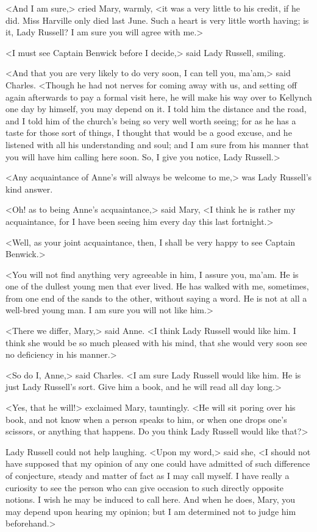 <And I am sure,> cried Mary, warmly, <it was a very little to his credit, if he did. Miss Harville only died last June. Such a heart is very little worth having; is it, Lady Russell? I am sure you will agree with me.>

<I must see Captain Benwick before I decide,> said Lady Russell, smiling.

<And that you are very likely to do very soon, I can tell you, ma'am,> said Charles. <Though he had not nerves for coming away with us, and setting off again afterwards to pay a formal visit here, he will make his way over to Kellynch one day by himself, you may depend on it. I told him the distance and the road, and I told him of the church's being so very well worth seeing; for as he has a taste for those sort of things, I thought that would be a good excuse, and he listened with all his understanding and soul; and I am sure from his manner that you will have him calling here soon. So, I give you notice, Lady Russell.>

<Any acquaintance of Anne's will always be welcome to me,> was Lady Russell's kind answer.

<Oh! as to being Anne's acquaintance,> said Mary, <I think he is rather my acquaintance, for I have been seeing him every day this last fortnight.>

<Well, as your joint acquaintance, then, I shall be very happy to see Captain Benwick.>

<You will not find anything very agreeable in him, I assure you, ma'am. He is one of the dullest young men that ever lived. He has walked with me, sometimes, from one end of the sands to the other, without saying a word. He is not at all a well-bred young man. I am sure you will not like him.>

<There we differ, Mary,> said Anne. <I think Lady Russell would like him. I think she would be so much pleased with his mind, that she would very soon see no deficiency in his manner.>

<So do I, Anne,> said Charles. <I am sure Lady Russell would like him. He is just Lady Russell's sort. Give him a book, and he will read all day long.>

<Yes, that he will!> exclaimed Mary, tauntingly. <He will sit poring over his book, and not know when a person speaks to him, or when one drops one's scissors, or anything that happens. Do you think Lady Russell would like that?>

Lady Russell could not help laughing. <Upon my word,> said she, <I should not have supposed that my opinion of any one could have admitted of such difference of conjecture, steady and matter of fact as I may call myself. I have really a curiosity to see the person who can give occasion to such directly opposite notions. I wish he may be induced to call here. And when he does, Mary, you may depend upon hearing my opinion; but I am determined not to judge him beforehand.>

